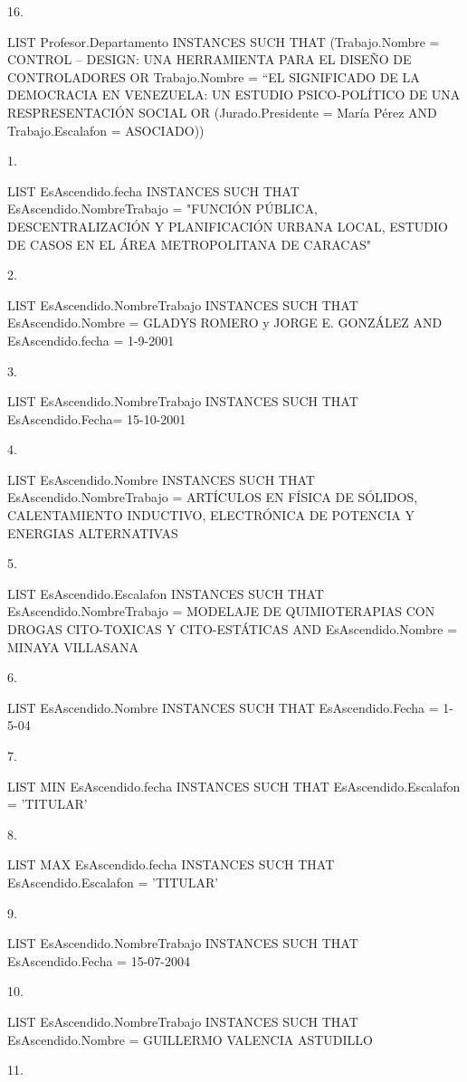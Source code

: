 16.

LIST Profesor.Departamento INSTANCES SUCH THAT 
(Trabajo.Nombre = CONTROL – DESIGN: UNA HERRAMIENTA PARA EL DISEÑO DE CONTROLADORES OR Trabajo.Nombre = “EL SIGNIFICADO DE LA DEMOCRACIA EN VENEZUELA: UN ESTUDIO PSICO-POLÍTICO DE UNA RESPRESENTACIÓN SOCIAL OR (Jurado.Presidente = María Pérez AND Trabajo.Escalafon = ASOCIADO))

%


1.

LIST EsAscendido.fecha INSTANCES
SUCH THAT EsAscendido.NombreTrabajo = "FUNCIÓN PÚBLICA, DESCENTRALIZACIÓN Y PLANIFICACIÓN URBANA LOCAL, ESTUDIO DE CASOS EN EL ÁREA METROPOLITANA DE CARACAS"

2.

LIST EsAscendido.NombreTrabajo INSTANCES SUCH THAT 
EsAscendido.Nombre = GLADYS ROMERO y JORGE E. GONZÁLEZ AND EsAscendido.fecha = 1-9-2001

3.

LIST EsAscendido.NombreTrabajo INSTANCES
SUCH THAT EsAscendido.Fecha= 15-10-2001

4.

LIST EsAscendido.Nombre INSTANCES SUCH THAT 
EsAscendido.NombreTrabajo = ARTÍCULOS EN FÍSICA DE SÓLIDOS, CALENTAMIENTO INDUCTIVO, ELECTRÓNICA DE POTENCIA Y ENERGIAS ALTERNATIVAS

5.

LIST EsAscendido.Escalafon INSTANCES SUCH THAT 
EsAscendido.NombreTrabajo = MODELAJE DE QUIMIOTERAPIAS CON DROGAS CITO-TOXICAS Y CITO-ESTÁTICAS AND EsAscendido.Nombre = MINAYA VILLASANA

6.

LIST EsAscendido.Nombre INSTANCES SUCH THAT 
EsAscendido.Fecha = 1-5-04

7.

LIST MIN EsAscendido.fecha INSTANCES
SUCH THAT EsAscendido.Escalafon = 'TITULAR'

8.

LIST MAX EsAscendido.fecha INSTANCES
SUCH THAT EsAscendido.Escalafon = 'TITULAR'

9.

LIST EsAscendido.NombreTrabajo INSTANCES SUCH THAT 
EsAscendido.Fecha = 15-07-2004

10. 

LIST EsAscendido.NombreTrabajo INSTANCES SUCH THAT 
EsAscendido.Nombre = GUILLERMO VALENCIA ASTUDILLO

11.

